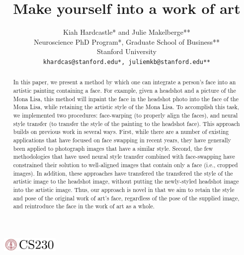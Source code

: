 \documentclass{article}
\title{Make yourself into a work of art}
\author{
  Kiah Hardcastle* and Julie Makelberge** \\
  Neuroscience PhD Program*, Graduate School of Business** \\
  Stanford University\\
  \texttt{khardcas@stanford.edu*, juliemkb@stanford.edu**} \\
}
\begin{document}

\begin{center}
\includegraphics[width=3cm, height=0.7cm]{CS230}
\end{center}

\maketitle

\begin{abstract}
In this paper, we present a method by which one can integrate a person's face into an artistic painting containing a face. For example, given a headshot and a picture of the Mona Lisa, this method will inpaint the face in the headshot photo into the face of the Mona Lisa, while retaining the artistic style of the Mona Lisa. To accomplish this task, we implemented two procedures: face-warping (to properly align the faces), and neural style transfer (to transfer the style of the painting to the headshot face). This approach builds on previous work in several ways. First, while there are a number of existing applications that have focused on face swapping in recent years, they have generally been applied to photograph images that have a similar style. Second, the few methodologies that have used neural style transfer combined with face-swapping have constrained their solution to well-aligned images that contain only a face (i.e., cropped images). In addition, these approaches have transfered the transfered the style of the artistic image to the headshot image, without putting the newly-styled headshot image into the artistic image. Thus, our approach is novel in that we aim to retain the style and pose of the original work of art's face, regardless of the pose of the supplied image, and  reintroduce the face in the work of art as a whole. 
\end{abstract}
\end{document}
